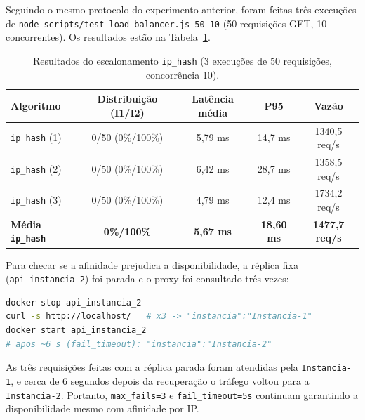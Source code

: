 \documentclass[12pt,a4paper]{article}
\begin{document}
Seguindo o mesmo protocolo do experimento anterior, foram feitas três execuções de \texttt{node scripts/test\_load\_balancer.js 50 10} (50 requisições GET, 10 concorrentes). Os resultados estão na Tabela~\ref{tab:iphash}.
\begin{table}[h!]
\centering
\caption{Resultados do escalonamento \texttt{ip\_hash} (3 execuções de 50 requisições, concorrência 10).}
\label{tab:iphash}
\begin{tabular}{lcccc}
\toprule
Algoritmo & Distribuição (I1/I2) & Latência média & P95 & Vazão \\
\midrule
\texttt{ip\_hash} (1) & 0/50 (0\%/100\%) & 5,79 ms & 14,7 ms & 1340,5 req/s \\
\texttt{ip\_hash} (2) & 0/50 (0\%/100\%) & 6,42 ms & 28,7 ms & 1358,5 req/s \\
\texttt{ip\_hash} (3) & 0/50 (0\%/100\%) & 4,79 ms & 12,4 ms & 1734,2 req/s \\
\textbf{Média \texttt{ip\_hash}} & \textbf{0\%/100\%} & \textbf{5,67 ms} & \textbf{18,60 ms} & \textbf{1477,7 req/s} \\
\bottomrule
\end{tabular}
\end{table}

Para checar se a afinidade prejudica a disponibilidade, a réplica fixa (\texttt{api\_instancia\_2}) foi parada e o proxy foi consultado três vezes:
\begin{lstlisting}[language=bash]
docker stop api_instancia_2
curl -s http://localhost/   # x3 -> "instancia":"Instancia-1"
docker start api_instancia_2
# apos ~6 s (fail_timeout): "instancia":"Instancia-2"
\end{lstlisting}
As três requisições feitas com a réplica parada foram atendidas pela \texttt{Instancia-1}, e cerca de 6 segundos depois da recuperação o tráfego voltou para a \texttt{Instancia-2}. Portanto, \texttt{max\_fails=3} e \texttt{fail\_timeout=5s} continuam garantindo a disponibilidade mesmo com afinidade por IP.
\end{document}
